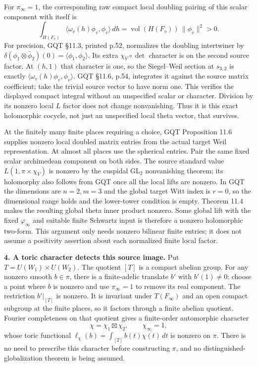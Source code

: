 \documentclass[11pt,a4paper]{article}
\theoremstyle{definition}
\begin{document}
For \(\pi_\infty=1\), the corresponding raw compact local doubling pairing of this scalar component with itself is \[
\int_{H(F_v)}\langle\omega_v(h)\phi_v,\phi_v\rangle\,dh
=\operatorname{vol}(H(F_v))\,\|\phi_v\|^2>0.
\] For precision, GQT §11.3, printed p.52, normalizes the doubling intertwiner by \(\delta(\phi_1\otimes\bar\phi_2)(0)=\langle\phi_1,\phi_2\rangle\). Its extra \(\chi_V\circ\det\) character is on the second source factor. At \((h,1)\) that character is one, so the Siegel--Weil section at \(s_{3,2}\) is exactly \(\langle\omega_v(h)\phi_v,\phi_v\rangle\). GQT §11.6, p.54, integrates it against the source matrix coefficient; take the trivial source vector to have norm one. This verifies the displayed compact integral without an unspecified scalar or character. Division by its nonzero local \(L\) factor does not change nonvanishing. Thus it is this exact holomorphic cocycle, not just an unspecified local theta vector, that survives.

At the finitely many finite places requiring a choice, GQT Proposition 11.6 supplies nonzero local doubled matrix entries from the actual target Weil representation. At almost all places use the spherical entries. Pair the same fixed scalar archimedean component on both sides. The source standard value \(L(1,\pi\times\chi_V)\) is nonzero by the cuspidal \(\mathrm{GL}_2\) nonvanishing theorem; its holomorphy also follows from GQT once all the local lifts are nonzero. In GQT the dimensions are \(n=2,m=3\) and the global target Witt index is \(r=0\), so the dimensional range holds and the lower-tower condition is empty. Theorem 11.4 makes the resulting global theta inner product nonzero. Some global lift with the fixed \(\varphi_\infty\) and suitable finite Schwartz input is therefore a nonzero holomorphic two-form. This argument only needs nonzero bilinear finite entries; it does not assume a positivity assertion about each normalized finite local factor.

\textbf{4. A toric character detects this source image.} Put \(T=U(W_1)\times U(W_2)\). The quotient \([T]\) is a compact abelian group. For any nonzero smooth \(b\in\pi\), there is a finite-adelic translate \(b'\) with \(b'(1)\ne0\): choose a point where \(b\) is nonzero and use \(\pi_\infty=1\) to remove its real component. The restriction \(b'|_{[T]}\) is nonzero. It is invariant under \(T(F_\infty)\) and an open compact subgroup at the finite places, so it factors through a finite abelian quotient. Fourier completeness on that quotient gives a finite-order automorphic character \[
\chi=\chi_1\boxtimes\chi_2,\qquad \chi_\infty=1,
\] whose toric functional \(\ell_\chi(b)=\int_{[T]}b(t)\overline{\chi(t)}\,dt\) is nonzero on \(\pi\). There is no need to prescribe this character before constructing \(\pi\), and no distinguished-globalization theorem is being assumed.
\end{document}
